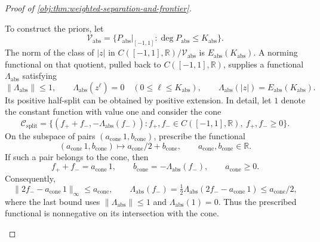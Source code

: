 \documentclass[11pt]{article}
\begin{document}
\begin{proof}[Proof of \cref{obj:thm:weighted-separation-and-frontier}]
\begin{enumerate}
To construct the priors, let
\[
\mathcal V_{\mathrm{abs}}
=\{P_{\mathrm{abs}}|_{[-1,1]}:\deg P_{\mathrm{abs}}\le K_{\mathrm{abs}}\}.
\]
The norm of the class of \(|z|\) in
\(C([-1,1],\mathbb R)/\mathcal V_{\mathrm{abs}}\) is
\(E_{\mathrm{abs}}(K_{\mathrm{abs}})\). A norming functional on that quotient, pulled back to \(C([-1,1],\mathbb R)\), supplies a functional
\(\Lambda_{\mathrm{abs}}\) satisfying
\[
\|\Lambda_{\mathrm{abs}}\|\le1,
\qquad
\Lambda_{\mathrm{abs}}(z^\ell)=0
\quad(0\le\ell\le K_{\mathrm{abs}}),
\qquad
\Lambda_{\mathrm{abs}}(|z|)=E_{\mathrm{abs}}(K_{\mathrm{abs}}).
\]
Its positive half-split can be obtained by positive extension. In detail, let \(1\) denote the constant function with value one and consider the cone
\[
\mathcal C_{\mathrm{split}}
=\{(f_++f_-,-\Lambda_{\mathrm{abs}}(f_-)):
 f_+,f_-\in C([-1,1],\mathbb R),\ f_+,f_-\ge0\}.
\]
On the subspace of pairs \((a_{\mathrm{cone}}\,1,b_{\mathrm{cone}})\), prescribe the functional
\[
(a_{\mathrm{cone}}\,1,b_{\mathrm{cone}})
\longmapsto a_{\mathrm{cone}}/2+b_{\mathrm{cone}},
\qquad a_{\mathrm{cone}},b_{\mathrm{cone}}\in\mathbb R.
\]
If such a pair belongs to the cone, then
\[
f_++f_-=a_{\mathrm{cone}}\,1,
\qquad
b_{\mathrm{cone}}=-\Lambda_{\mathrm{abs}}(f_-),
\qquad a_{\mathrm{cone}}\ge0.
\]
Consequently,
\[
\|2f_--a_{\mathrm{cone}}\,1\|_\infty\le a_{\mathrm{cone}},
\qquad
\Lambda_{\mathrm{abs}}(f_-)
=\tfrac12\Lambda_{\mathrm{abs}}(2f_--a_{\mathrm{cone}}\,1)
\le a_{\mathrm{cone}}/2,
\]
where the last bound uses \(\|\Lambda_{\mathrm{abs}}\|\le1\) and
\(\Lambda_{\mathrm{abs}}(1)=0\). Thus the prescribed functional is nonnegative on its intersection with the cone.


\end{enumerate}
\end{proof}
\end{document}
